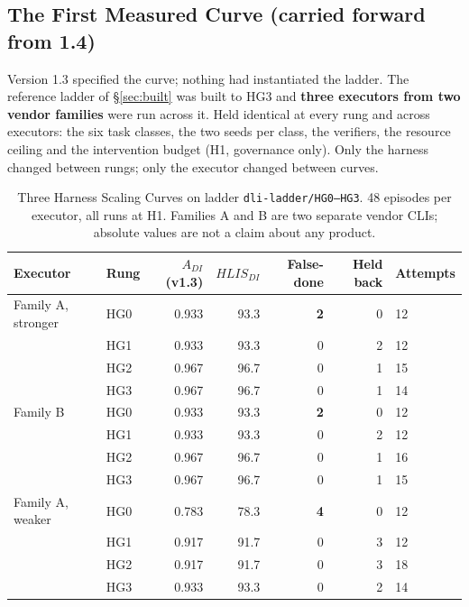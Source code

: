 \documentclass[11pt]{article}
\theoremstyle{definition}
\begin{document}
\subsection{The First Measured Curve (carried forward from 1.4)}\label{sec:measured}

Version 1.3 specified the curve; nothing had instantiated the ladder. The reference ladder of \S\ref{sec:built} was built to HG3 and \textbf{three executors from two vendor families} were run across it. Held identical at every rung and across executors: the six task classes, the two seeds per class, the verifiers, the resource ceiling and the intervention budget (H1, governance only). Only the harness changed between rungs; only the executor changed between curves.

\begin{table}[h]
\centering\small
\begin{tabularx}{\textwidth}{@{}p{}lrrrrY@{}}
\toprule
Executor & Rung & $A_{DI}$ (v1.3) & $HLIS_{DI}$ & False-done & Held back & Attempts \\
\midrule
Family A, stronger & HG0 & 0.933 & 93.3 & \textbf{2} & 0 & 12 \\
                   & HG1 & 0.933 & 93.3 & 0 & 2 & 12 \\
                   & HG2 & 0.967 & 96.7 & 0 & 1 & 15 \\
                   & HG3 & 0.967 & 96.7 & 0 & 1 & 14 \\
\midrule
Family B & HG0 & 0.933 & 93.3 & \textbf{2} & 0 & 12 \\
         & HG1 & 0.933 & 93.3 & 0 & 2 & 12 \\
         & HG2 & 0.967 & 96.7 & 0 & 1 & 16 \\
         & HG3 & 0.967 & 96.7 & 0 & 1 & 15 \\
\midrule
Family A, weaker & HG0 & 0.783 & 78.3 & \textbf{4} & 0 & 12 \\
                 & HG1 & 0.917 & 91.7 & 0 & 3 & 12 \\
                 & HG2 & 0.917 & 91.7 & 0 & 3 & 18 \\
                 & HG3 & 0.933 & 93.3 & 0 & 2 & 14 \\
\bottomrule
\end{tabularx}
\caption{Three Harness Scaling Curves on ladder \texttt{dli-ladder/HG0--HG3}. 48 episodes per executor, all runs at H1. Families A and B are two separate vendor CLIs; absolute values are not a claim about any product.}
\end{table}
\end{document}
